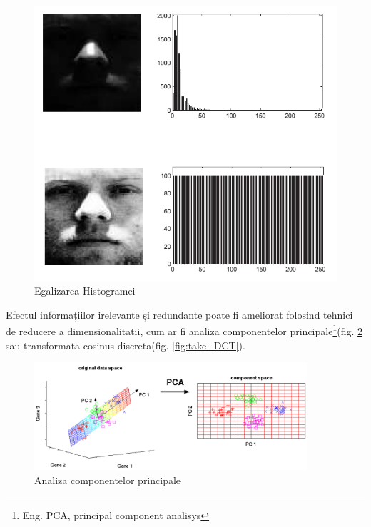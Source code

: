 \begin{figure}[H]
	\includegraphics[width=1.0\textwidth]{imagini/histogram_equalization.png}
	\caption{Egalizarea Histogramei\footnotemark}
	\label{fig:egalizarea_histogrameis}
\end{figure}


Efectul informațiilor irelevante și redundante poate fi ameliorat folosind tehnici de reducere a dimensionalitatii, cum ar fi analiza componentelor principale\footnote{Eng. PCA, principal component analisys}(fig. \ref{fig:fig_pca_principal_component_analysis} sau transformata cosinus discreta(fig. \ref{fig:take_DCT}).

\begin{figure}[H]
	\centering
		\includegraphics[width=0.90\textwidth]{imagini/fig_pca_principal_component_analysis.png}
	\caption{Analiza componentelor principale\footnotemark}
	\label{fig:fig_pca_principal_component_analysis}
\end{figure}

